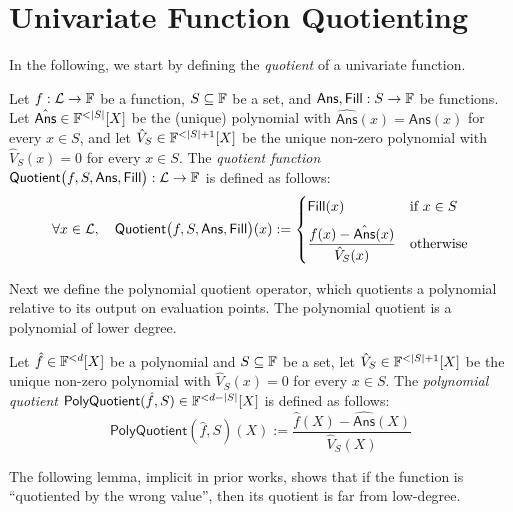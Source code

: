 

\section{Univariate Function Quotienting}\label{sec:quotienting}

In the following, we start by defining the \emph{quotient} of a univariate function.
\begin{definition}\label{def:quotient}
\leanok
    Let $f:\mathcal{L}\to\mathbb{F}$ be a function, $S\subseteq\mathbb{F}$ be a set, and $\mathsf{Ans},\mathsf{Fill}: S\rightarrow\mathbb{F}$ be functions. Let $\hat{\mathsf{Ans}}\in\field^{<|S|}[X]$ be the (unique) polynomial with $\hat{\mathsf{Ans}}(x)=\mathsf{Ans}(x)$ for every $x\in S$, and let $\hat{V}_S\in\field^{<|S|+1}[X]$ be the unique non-zero polynomial with $\hat{V}_S(x)=0$ for every $x\in S$.
    The \emph{quotient function} $\mathsf{Quotient}\bigl(f,S,\mathsf{Ans},\mathsf{Fill}\bigr): \mathcal{L}\to\mathbb{F}$
    is defined as follows:
\[
\forall x \in \mathcal{L},\quad
\mathsf{Quotient}\bigl(f,S,\mathsf{Ans},\mathsf{Fill}\bigr)(x)
:=
\begin{cases}
\mathsf{Fill}(x)
& \text{if } x \in S \\[6pt]
\dfrac{f(x) - \hat{\mathsf{Ans}}(x)}{\hat{V}_S(x)}
& \text{otherwise}
\end{cases}
\]
\end{definition}

Next we define the polynomial quotient operator, which quotients a polynomial relative to its output on evaluation points. The polynomial quotient is a polynomial of lower degree.

\begin{definition}\label{def:poly_quotient}
\leanok
\uses{}
    Let $\hat{f}\in\mathbb{F}^{<d}[X]$ be a polynomial and $S\subseteq\mathbb{F}$ be a set, let $\hat{V}_S\in\field^{<|S|+1}[X]$ be the unique non-zero polynomial with $\hat{V}_S(x)=0$ for every $x\in S$. The \emph{polynomial quotient} $\mathsf{PolyQuotient}(\hat{f},S)\in\mathbb{F}^{<d-|S|}[X]$ is defined as follows:
    \[
            \mathsf{PolyQuotient}(\hat{f},S)(X):=\frac{\hat{f}(X)-\hat{\mathsf{Ans}}(X)}{\hat{V}_S(X)}
    \]

\end{definition}

The following lemma, implicit in prior works, shows that if the function is ``quotiented by the wrong value'', then its quotient is far from low-degree.

